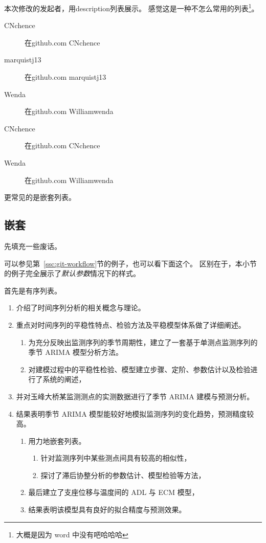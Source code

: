 \documentclass[../Main/thesis]{subfiles}
\begin{document}
本次修改的发起者，用description列表展示。
感觉这是一种不怎么常用的列表\footnote{大概是因为 word 中没有吧哈哈哈}。

\begin{description}
  \item[CNchence] 在github.com CNchence
  \item[marquistj13] 在github.com marquistj13
  \item[Wenda] 在github.com Williamwenda
  \item[CNchence] 在github.com CNchence
  \item[Wenda] 在github.com Williamwenda
\end{description}

更常见的是嵌套列表。

\subsection{嵌套}

先填充一些废话。\zhlipsum[6]

可以参见第~\ref{ssc:git-workflow}节的例子，也可以看下面这个。
区别在于，本小节的例子完全展示了\emph{默认参数}情况下的样式。

首先是有序列表。
\begin{enumerate}
  \item 介绍了时间序列分析的相关概念与理论。
  \item 重点对时间序列的平稳性特点、检验方法及平稳模型体系做了详细阐述。
  \begin{enumerate}
    \item 为充分反映出监测序列的季节周期性，建立了一套基于单测点监测序列的季节 ARIMA 模型分析方法。
    \item 对建模过程中的平稳性检验、模型建立步骤、定阶、参数估计以及检验进行了系统的阐述，
  \end{enumerate}
  \item 并对玉峰大桥某监测测点的实测数据进行了季节 ARIMA 建模与预测分析。
  \item 结果表明季节 ARIMA 模型能较好地模拟监测序列的变化趋势，预测精度较高。
  \begin{enumerate}
    \item 用力地嵌套列表。
    \begin{enumerate}
      \item 针对监测序列中某些测点间具有较高的相似性，
      \item 探讨了滞后协整分析的参数估计、模型检验等方法，
    \end{enumerate}
    \item 最后建立了支座位移与温度间的 ADL 与 ECM 模型，
    \item 结果表明该模型具有良好的拟合精度与预测效果。
  \end{enumerate}
\end{enumerate}
\end{document}
